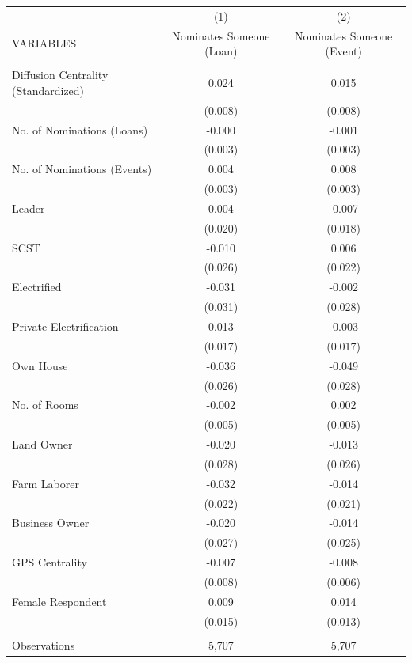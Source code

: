 \begin{tabular}{lcc} \hline
 & (1) & (2) \\
VARIABLES & Nominates Someone (Loan) & Nominates Someone (Event) \\ \hline
 &  &  \\
Diffusion Centrality (Standardized) & 0.024 & 0.015 \\
 & (0.008) & (0.008) \\
No. of Nominations (Loans) & -0.000 & -0.001 \\
 & (0.003) & (0.003) \\
No. of Nominations (Events) & 0.004 & 0.008 \\
 & (0.003) & (0.003) \\
Leader & 0.004 & -0.007 \\
 & (0.020) & (0.018) \\
SCST & -0.010 & 0.006 \\
 & (0.026) & (0.022) \\
Electrified & -0.031 & -0.002 \\
 & (0.031) & (0.028) \\
Private Electrification & 0.013 & -0.003 \\
 & (0.017) & (0.017) \\
Own House & -0.036 & -0.049 \\
 & (0.026) & (0.028) \\
No. of Rooms & -0.002 & 0.002 \\
 & (0.005) & (0.005) \\
Land Owner & -0.020 & -0.013 \\
 & (0.028) & (0.026) \\
Farm Laborer & -0.032 & -0.014 \\
 & (0.022) & (0.021) \\
Business Owner & -0.020 & -0.014 \\
 & (0.027) & (0.025) \\
GPS Centrality & -0.007 & -0.008 \\
 & (0.008) & (0.006) \\
Female Respondent & 0.009 & 0.014 \\
 & (0.015) & (0.013) \\
 &  &  \\
 Observations & 5,707 & 5,707 \\ \hline
\end{tabular}
